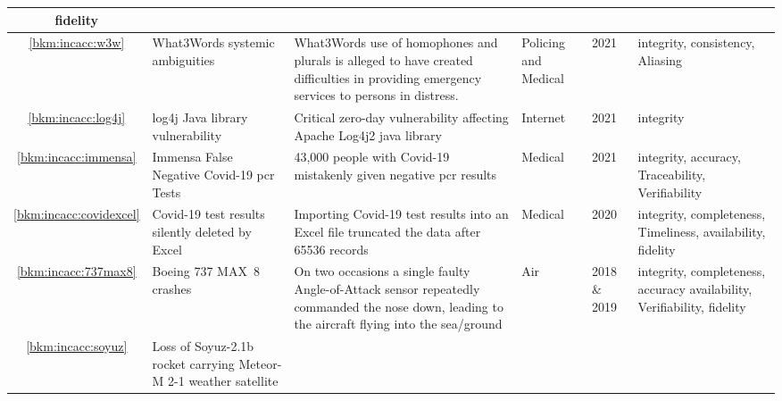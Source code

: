 \begin{longtable}{|C{}|L{}|L{}|L{}|L{}|L{}|}
  \gls{fidelity}\\
  \hline
  \ref{bkm:incacc:w3w} & What3Words systemic ambiguities &
  What3Words use of homophones and plurals is alleged to have created difficulties in providing emergency services
  to persons in distress.
  &
  Policing and Medical & 2021 & \Gls{integrity},
  \gls{consistency},
  Aliasing\\
  \hline
        \ref{bkm:incacc:log4j} & log4j Java library vulnerability &
        Critical zero-day vulnerability affecting Apache Log4j2 java library &
        Internet & 2021 & \Gls{integrity}\\
        \hline
        \ref{bkm:incacc:immensa} & Immensa False Negative Covid-19 \gls{pcr} Tests &
        43,000 people with Covid-19 mistakenly given negative \gls{pcr} results &
        Medical & 2021 & \Gls{integrity}, \gls{accuracy}, Traceability, Verifiability\\
        \hline
        \ref{bkm:incacc:covidexcel} & Covid-19 test results silently deleted by Excel &
        Importing Covid-19 test results into an Excel file truncated the data after 65536 records &
        Medical & 2020 & \Gls{integrity}, \gls{completeness}, Timeliness, \gls{availability}, \gls{fidelity}\\
        \hline
	\ref{bkm:incacc:737max8} & Boeing 737 MAX~8 crashes &
	On two occasions a single faulty Angle-of-Attack sensor repeatedly commanded the nose down,
        leading to the aircraft flying into the sea/ground
	& Air & 2018 \& 2019 & \Gls{integrity}, \gls{completeness}, \gls{accuracy}\vspace{1ex} \gls{availability}, Verifiability, \gls{fidelity}\\ 
	\hline
        \ref{bkm:incacc:soyuz} & Loss of Soyuz-2.1b rocket carrying Meteor-M 2-1 weather satellite &

\end{longtable}
